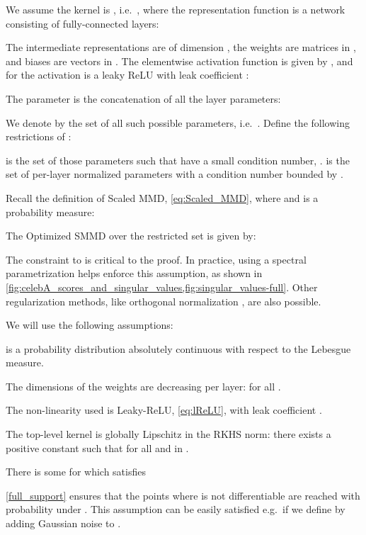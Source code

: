 \documentclass{article}
\begin{document}
We assume the kernel is ,
i.e.\ ,
where the representation function  is a network 
consisting of  fully-connected layers:

The intermediate representations  are of dimension ,
the weights  are matrices in ,
and biases  are vectors in .
The elementwise activation function  is given by
,
and for  the activation  is a leaky ReLU with
leak coefficient :



The parameter  is the concatenation of all the layer parameters:

We denote by  the set of all such possible parameters,
i.e.\ .
Define the following restrictions of :

 is the set of those parameters such that  have a small condition number,
.
 is the set of per-layer normalized parameters with a condition number bounded by .


Recall the definition of Scaled MMD, \cref{eq:Scaled_MMD},
where  and  is a probability measure:

The Optimized SMMD over the restricted set  is given by:

The constraint to  is critical to the proof.
In practice, using a spectral parametrization helps enforce this assumption, as shown in \cref{fig:celebA_scores_and_singular_values,fig:singular_values-full}.
Other regularization methods, like orthogonal normalization \cite{Brock:2016}, are also possible.


We will use the following assumptions:
\begin{assumplist2}
  \item \label{full_support}  is a probability distribution absolutely continuous with respect to the Lebesgue measure.
  \item \label{decreasing_dimensions} The dimensions of the weights are decreasing per layer:  for all .
  \item \label{leaky_relu} The non-linearity used is Leaky-ReLU, \eqref{eq:lReLU}, with leak coefficient .
  \item \label{Lichitz_kernel} The top-level kernel  is globally Lipschitz in the RKHS norm: there exists a positive constant  such that  for all  and  in .
  \item \label{Convexe_Hessian} There is some  for which  satisfies
  
\end{assumplist2}

\cref{full_support}
ensures that the points where  is not differentiable
are reached with probability  under .
This assumption can be easily satisfied
e.g.\ if we define  by adding Gaussian noise to .
\end{document}
